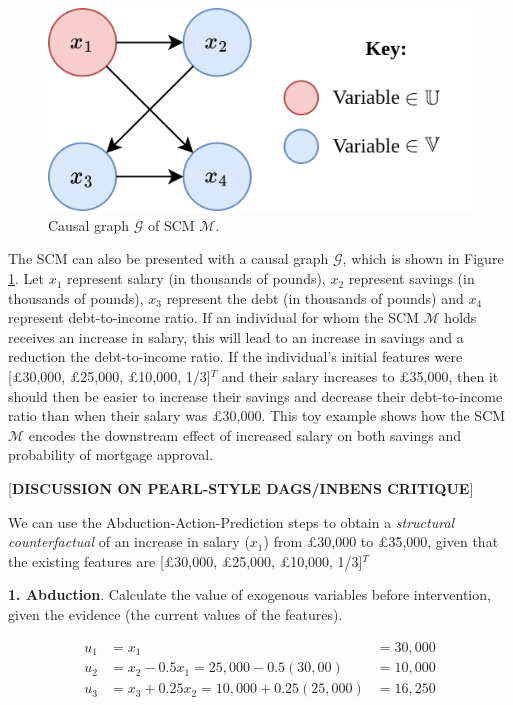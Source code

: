 \begin{figure}[!htb]
	\centering
	\includegraphics[width=0.6\linewidth]{images/draw.io/Simple SCM.png}
	\caption{Causal graph $\mathcal{G}$ of SCM $\mathcal{M}$.}
	\label{fig:toy_scm}
\end{figure}


The SCM can also be presented with a causal graph $\mathcal{G}$, which is shown in Figure \ref{fig:toy_scm}. Let $x_1$ represent salary (in thousands of pounds), $x_2$ represent savings (in thousands of pounds), $x_3$ represent the debt (in thousands of pounds) and $x_4$ represent debt-to-income ratio. If an individual for whom the SCM $\mathcal{M}$ holds receives an increase in salary, this will lead to an increase in savings and a reduction the debt-to-income ratio. If the individual's initial features were [£30,000, £25,000, £10,000, 1/3]$^T$ and their salary increases to £35,000, then it should then be easier to increase their savings and decrease their debt-to-income ratio than when their salary was £30,000. This toy example shows how the SCM $\mathcal{M}$ encodes the downstream effect of increased salary on both savings and probability of mortgage approval.

[\textbf{DISCUSSION ON PEARL-STYLE DAGS/INBENS CRITIQUE}]

We can use the Abduction-Action-Prediction steps \citep{pearl2016causal} to obtain a \textit{structural counterfactual} of an increase in salary ($x_1$) from £30,000 to £35,000, given that the existing features are [£30,000, £25,000, £10,000, 1/3]$^T$ 

\textbf{1. Abduction}. Calculate the value of exogenous variables before intervention, given the evidence (the current values of the features).

\begin{align}
	u_1 & = x_1 & =  30,000 \\ \nonumber
	u_2 & = x_2 - 0.5x_1 = 25,000 - 0.5(30,00) & = 10,000 \\ \nonumber
	u_3 & = x_3 + 0.25x_2 = 10,000 + 0.25(25,000) & = 16,250
\end{align}

